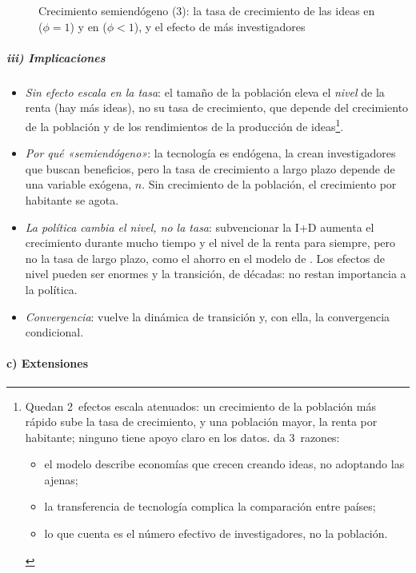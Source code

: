 \documentclass[11pt]{article}
\begin{document}
\begin{figure}[H]
\centering
\caption{Crecimiento semiendógeno (3): la tasa de crecimiento de las ideas en  ($\phi=1$) y en  ($\phi<1$), y el efecto de más investigadores}\label{fig:jones}
\end{figure}

\subparagraph{iii) Implicaciones}

\begin{itemize}
\item \emph{Sin efecto escala en la tasa}: el tamaño de la población eleva el \emph{nivel} de la renta (hay más ideas), no su tasa de crecimiento, que depende del crecimiento de la población y de los rendimientos de la producción de ideas\footnote{Quedan 2~efectos escala atenuados: un crecimiento de la población más rápido sube la tasa de crecimiento, y una población mayor, la renta por habitante; ninguno tiene apoyo claro en los datos\nocite{Acemoglu2009}. \textcite[pp.~777-778]{Jones1995} da 3~razones:
\begin{itemize}
\item el modelo describe economías que crecen creando ideas, no adoptando las ajenas;
\item la transferencia de tecnología complica la comparación entre países;
\item lo que cuenta es el número efectivo de investigadores, no la población.
\end{itemize}}.
\item \emph{Por qué «semiendógeno»}: la tecnología es endógena, la crean investigadores que buscan beneficios, pero la tasa de crecimiento a largo plazo depende de una variable exógena, $n$. Sin crecimiento de la población, el crecimiento por habitante se agota.
\item \emph{La política cambia el nivel, no la tasa}: subvencionar la I+D aumenta el crecimiento durante mucho tiempo y el nivel de la renta para siempre, pero no la tasa de largo plazo, como el ahorro en el modelo de . Los efectos de nivel pueden ser enormes y la transición, de décadas: no restan importancia a la política.
\item \emph{Convergencia}: vuelve la dinámica de transición y, con ella, la convergencia condicional.
\end{itemize}

\paragraph{c) Extensiones}
\end{document}
